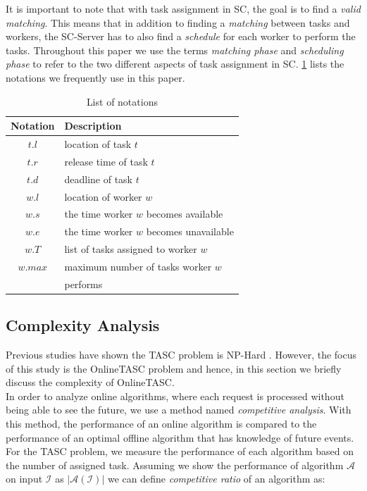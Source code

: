 It is important to note that with task assignment in SC, the goal is to find a \textit{valid matching}. This means that in addition to finding a \textit{matching} between tasks and workers, the SC-Server has to also find a \textit{schedule} for each worker to perform the tasks. Throughout this paper we use the terms \textit{matching phase} and \textit{scheduling phase} to refer to the two different aspects of task assignment in SC. \cref{tab:notation} lists the notations we frequently use in this paper.\\

\begin{table}
\begin{center}
\begin{tabular}{| c | l |} \hline
Notation	&	Description \\ \hline
$t.l$		&	location of task $t$ \\ \hline
$t.r$		&	release time of task $t$ \\ \hline
$t.d$		& 	deadline of task $t$ \\ \hline
$w.l$		&	location of worker $w$ \\ \hline
$w.s$		&	the time worker $w$ becomes available \\ \hline
$w.e$		&	the time worker $w$ becomes unavailable \\ \hline
$w.T$		&	list of tasks assigned to worker $w$ \\ \hline
$w.max$		&	maximum number of tasks worker $w$ \\
			&	performs \\ \hline
\end{tabular}
\caption{List of notations}
\label{tab:notation}
\end{center}
\end{table}

\subsection{Complexity Analysis}

Previous studies have shown the TASC problem is NP-Hard \cite{Kazemi13, Deng15}. However, the focus of this study is the OnlineTASC problem and hence, in this section we briefly discuss the complexity of OnlineTASC.\\

In order to analyze online algorithms, where each request is processed without being able to see the future, we use a method named \textit{competitive analysis}\cite{Sleator85}. With this method, the performance of an online algorithm is compared to the performance of an optimal offline algorithm that has knowledge of future events. For the TASC problem, we measure the performance of each algorithm based on the number of assigned task. Assuming we show the performance of algorithm $\mathcal{A}$ on input $\mathcal{I}$ as $\vert \mathcal{A}\left( \mathcal{I} \right) \vert$ we can define \textit{competitive ratio} of an algorithm as:

